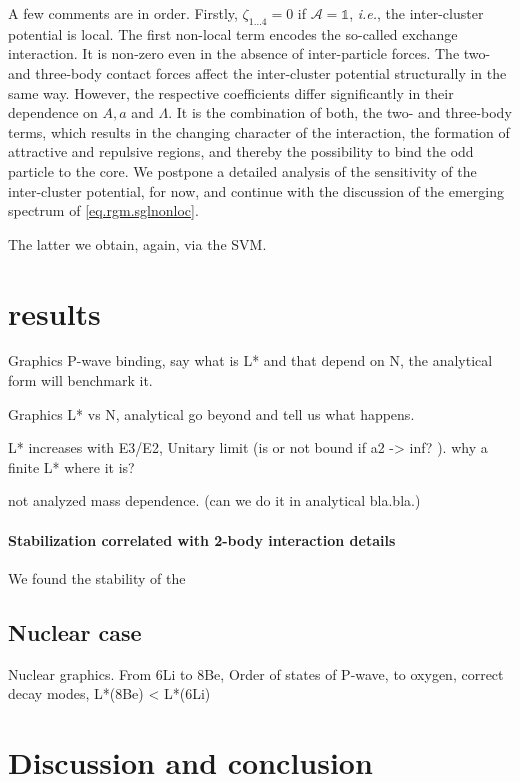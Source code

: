 \documentclass[aps,nofootinbib,prl,showpacs,twocolumn,groupedaddress,superscriptaddress]
{revtex4}
\newcommand{\ie}{\textit{i.e.}\;}
\begin{document}
A few comments are in order. Firstly, $\zeta_{1\ldots4}=0$ if $\mathcal{A}=\mathbb{1}$, \ie, the
inter-cluster potential is local. The first non-local term encodes the so-called exchange interaction.
It is non-zero even in the absence of inter-particle forces. The two- and three-body
contact forces affect the inter-cluster potential structurally in the same way. However, the respective
coefficients differ significantly in their dependence on $A,a$ and $\Lambda$. It is the combination
of both, the two- and three-body terms, which results in the changing character of the interaction,
the formation of attractive and repulsive regions, and thereby the possibility to bind the odd particle
to the core. We postpone a detailed analysis of the sensitivity of the inter-cluster potential,
for now, and continue with the discussion of the emerging spectrum of \eqref{eq.rgm.sglnonloc}.

The latter we obtain, again, via the SVM.
\section{results}

Graphics P-wave binding, 
say what is L* and that depend on N, 
the analytical form will benchmark it.

Graphics L* vs N, 
analytical go beyond and tell us what happens.

L* increases with E3/E2,
Unitary limit (is or not bound if a2 -> inf? ).
why a finite L* where it is?

not analyzed mass dependence. (can we do it in analytical bla.bla.)

\paragraph{Stabilization correlated with 2-body interaction details}
We found the stability of the

\subsection{Nuclear case}

Nuclear graphics. 
From 6Li to 8Be, 
Order of states of P-wave, 
to oxygen, 
correct decay modes, 
L*(8Be) < L*(6Li)

\section{Discussion and conclusion}
\end{document}
